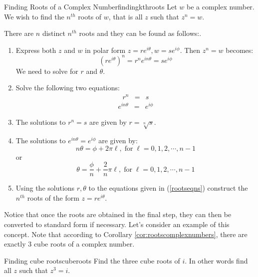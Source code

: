 \begin{procedure}{Finding Roots of a Complex Number}{findingkthroots}
Let $w$ be a complex number. We wish to find the $n^{th}$ roots of $w$, that is all $z$ such that $z^n = w$. 

There are $n$ distinct $n^{th}$ roots and they can be found as follows:. 
 
\begin{enumerate}
\item Express both $z$ and $w$ in polar form $z=re^{i\theta}, w=se^{i\phi}$. Then $z^n = w$ becomes:
\[
(re^{i\theta})^n = r^n e^{i n \theta} = se^{i\phi}
\]
We need to solve for $r$ and $\theta$. 
\item Solve the following two equations:
\begin{eqnarray*}
r^n &=& s 
\end{eqnarray*}
\begin{eqnarray}
e^{i n \theta} &=& e^{i \phi}
\label{rootseqns}
\end{eqnarray}
\item The solutions to $r^n = s$ are given by $r = \sqrt[n]{s}$. 

\item The solutions to $e^{i n \theta} = e^{i \phi}$ are given by:
\[
n\theta = \phi + 2\pi \ell,  \; \mbox{for} \; \ell = 0,1,2, \cdots, n-1
\]
or
\[
\theta = \frac{\phi}{n} + \frac{2}{n} \pi \ell, \; \mbox{for} \; \ell = 0,1,2, \cdots, n-1 
\]
\item
Using the solutions $r, \theta$ to the equations given in (\ref{rootseqns})
construct the $n^{th}$ roots of the form $z = re^{i\theta}$.  
\end{enumerate}
\end{procedure}

Notice that once the roots are obtained in the final step, they can then be converted to standard form if necessary. Let's consider an example of this concept. Note that according to Corollary \ref{cor:rootscomplexnumbers}, 
there are exactly $3$ cube roots of a complex number.

\begin{example}{Finding cube roots}{cuberoots}
Find the three cube roots of $i.$ In other words find all $z$ such that $z^3 = i$. 
\end{example}

